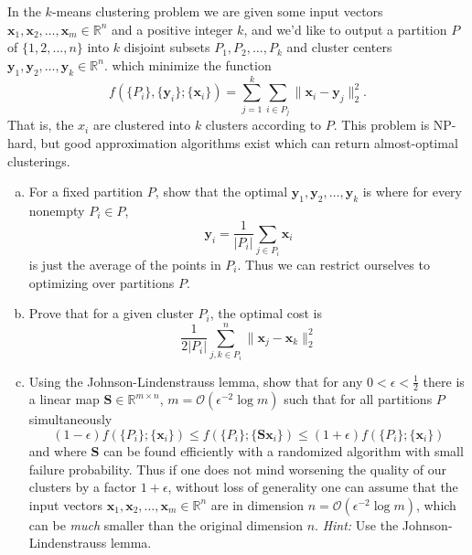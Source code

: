 \documentclass[12pt,letterpaper,cm]{hmcpset}
\newcommand\x{\boldsymbol{x}}
\newcommand\y{\boldsymbol{y}}
\renewcommand\S{\boldsymbol{S}}
\begin{document}
\begin{problem}
    In the $k$-means clustering problem we are given some input vectors
    $\x_1,\x_2,\ldots,\x_m\in\mathbb{R}^n$ and a positive integer $k$,
    and we'd like to output a partition $P$ of $\{1,2,\ldots,n\}$ into $k$
    disjoint subsets $P_1,P_2,\ldots,P_k$ and cluster centers $\y_1,\y_2,\ldots,\y_k\in\mathbb{R}^n$.
    which minimize the function
    \[
        f(\{P_i\},\{\y_i\};\{\x_i\}) = \sum_{j=1}^k \sum_{i\in P_j} \bigl\| \x_i - \y_j \bigr\|_2^2.
    \]
    That is, the $x_i$ are clustered into $k$ clusters according to $P$. This problem is NP-hard,
    but good approximation algorithms exist which can return almost-optimal clusterings.
\begin{enumerate}[(a)]
    \item For a fixed partition $P$, show that the optimal $\y_1,\y_2,\ldots,\y_k$ is where
        for every nonempty $P_i\in P$, $$\y_i = \frac{1}{|P_i|}\sum_{j\in P_i} \x_i$$ is just
        the average of the points in $P_i$. Thus we can restrict ourselves to optimizing over
        partitions $P$.
    \item Prove that for a given cluster $P_i$, the optimal cost is
        \[
            \frac{1}{2|P_i|}\sum_{j,k\in P_i}^n \|\x_j-\x_k\|_2^2
        \]
    \item Using the Johnson-Lindenstrauss lemma, show that for any $0 < \epsilon < \tfrac{1}{2}$
        there is a linear map $\S\in\mathbb{R}^{m\times n}$, $m = \mathcal{O}(\epsilon^{-2}\log m)$
        such that for all partitions $P$ simultaneously
        \[
            (1-\epsilon)f(\{P_i\};\{\x_i\}) \leq f(\{P_i\};\{\S\x_i\}) \leq (1+\epsilon)f(\{P_i\};\{\x_i\})
        \]
        and where $\S$ can be found efficiently with a randomized algorithm with small failure probability.
        Thus if one does not mind worsening the quality of our clusters by a factor $1+\epsilon$, without
        loss of generality one can assume that the input vectors $\x_1,\x_2,\ldots,\x_m\in\mathbb{R}^n$
        are in dimension $n = \mathcal{O}(\epsilon^{-2} \log m)$, which can be \emph{much} smaller than the
        original dimension $n$. \textit{Hint:} Use the Johnson-Lindenstrauss lemma.
\end{enumerate}
\end{problem}

\begin{solution}
    \vfill
\end{solution}
\end{document}
